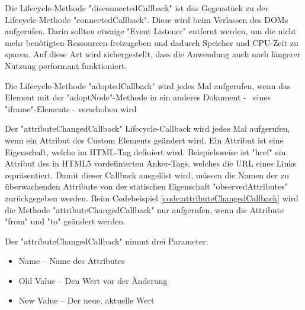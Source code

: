 
Die Lifecycle-Methode "{\ttfamily disconnectedCallback}" ist das Gegenstück zu der Lifecycle-Methode "{\ttfamily connectedCallback}".
Diese wird beim Verlassen des DOMs aufgerufen. Darin sollten etwaige "Event Listener" entfernt werden, um die nicht mehr benötigten Ressourcen freizugeben und dadurch Speicher und CPU-Zeit zu sparen. 
Auf diese Art wird sichergestellt, dass die Anwendung auch nach längerer Nutzung performant funktioniert. \cite{MDNWebCustomElements}


Die Lifecycle-Methode "{\ttfamily adoptedCallback}" wird jedes Mal aufgerufen, wenn das Element mit der "{\ttfamily adoptNode}"-Methode in ein anderes Dokument - \zb\ eines "{\ttfamily iframe}"-Elements - verschoben wird \cite{MDNWebCustomElements}


Der "{\ttfamily attributeChangedCallback}" Lifecycle-Callback wird jedes Mal aufgerufen, wenn ein Attribut des Custom Elements geändert wird. 
Ein Attribut ist eine Eigenschaft, welche im HTML-Tag definiert wird. 
Beispielsweise ist "{\ttfamily href}" ein Attribut des in HTML5 vordefinierten Anker-Tags, welches die URL eines Links repräsentiert. 
Damit dieser Callback ausgelöst wird, müssen die Namen der zu überwachenden Attribute von der statischen Eigenschaft "{\ttfamily observedAttributes}" zurückgegeben werden. \cite{MDNWebCustomElements} Beim Codebeispiel \ref{code:attributeChangedCallback} wird die Methode "{\ttfamily attributeChangedCallback}" nur aufgerufen, wenn die Attribute "from" und "to" geändert werden.
    
Der "{\ttfamily attributeChangedCallback}" nimmt drei Parameter\cite{MDNWebCustomElements}:
\begin{itemize}
    \item Name -- Name des Attributes
    \item Old Value -- Den Wert vor der Änderung
    \item New Value -- Der neue, aktuelle Wert 
\end{itemize}


